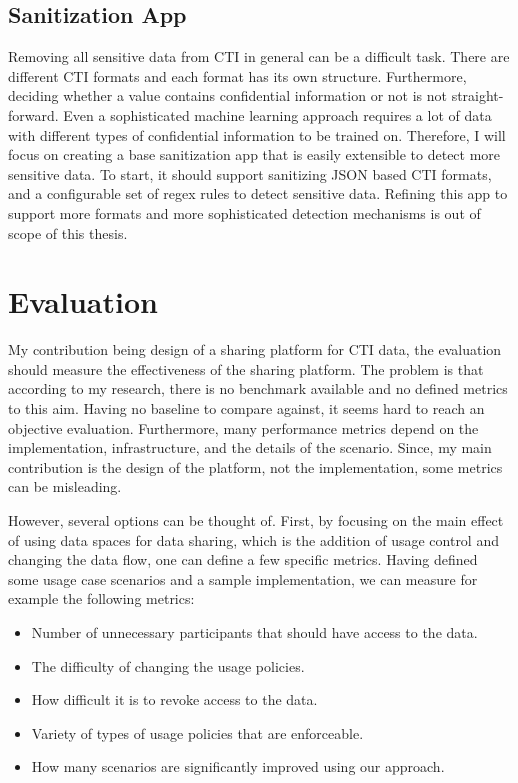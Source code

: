 \documentclass{article}
\begin{document}
\subsection*{Sanitization App}
Removing all sensitive data from CTI in general can be a difficult task. There are different CTI formats and each format has its own structure. Furthermore, deciding whether a value contains confidential information or not is not straight-forward. Even a sophisticated machine learning approach requires a lot of data with different types of confidential information to be trained on. Therefore, I will focus on creating a base sanitization app that is easily extensible to detect more sensitive data. To start, it should support sanitizing JSON based CTI formats, and a configurable set of regex rules to detect sensitive data. Refining this app to support more formats and more sophisticated detection mechanisms is out of scope of this thesis.

\section{Evaluation} %


My contribution being design of a sharing platform for CTI data, the evaluation should measure the effectiveness of the sharing platform. The problem is that according to my research, there is no benchmark available and no defined metrics to this aim. Having no baseline to compare against, it seems hard to reach an objective evaluation. Furthermore, many performance metrics depend on the implementation, infrastructure, and the details of the scenario. Since, my main contribution is the design of the platform, not the implementation, some metrics can be misleading. 

However, several options can be thought of. First, by focusing on the main effect of using data spaces for data sharing, which is the addition of usage control and changing the data flow, one can define a few specific metrics. Having defined some usage case scenarios and a sample implementation, we can measure for example the following metrics: 
\begin{itemize}
    \item Number of unnecessary participants that should have access to the data.
    \item The difficulty of changing the usage policies.
    \item How difficult it is to revoke access to the data.
    \item Variety of types of usage policies that are enforceable.
    \item How many scenarios are significantly improved using our approach.
\end{itemize}
\end{document}
